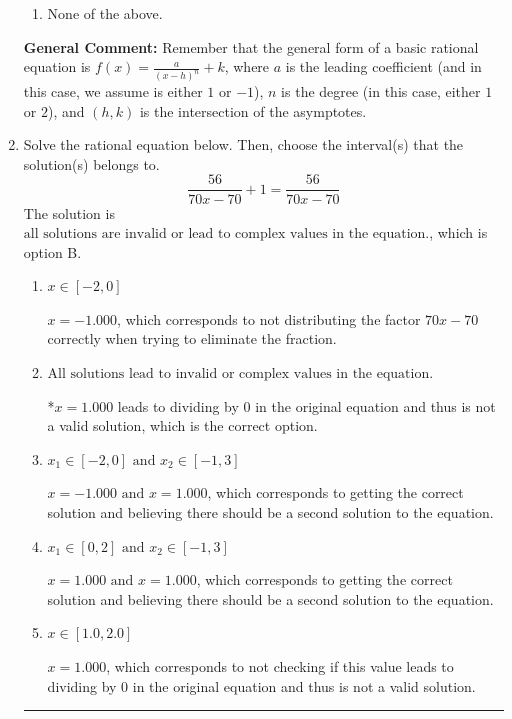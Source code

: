\documentclass{extbook}[14pt]
\newcommand{\litem}[1]{\item #1

\rule{\textwidth}{0.4pt}}
\begin{document}
\begin{enumerate}
{\begin{enumerate}[label=\Alph*.]
\begin{multicols}{2}
\end{multicols}\item None of the above.\end{enumerate}
\textbf{General Comment:} Remember that the general form of a basic rational equation is $ f(x) = \frac{a}{(x-h)^n} + k$, where $a$ is the leading coefficient (and in this case, we assume is either $1$ or $-1$), $n$ is the degree (in this case, either $1$ or $2$), and $(h, k)$ is the intersection of the asymptotes.
}
\litem{
Solve the rational equation below. Then, choose the interval(s) that the solution(s) belongs to.
\[ \frac{56}{70x -70} + 1 = \frac{56}{70x -70} \]The solution is \( \text{all solutions are invalid or lead to complex values in the equation.} \), which is option B.\begin{enumerate}[label=\Alph*.]
\item \( x \in [-2,0] \)

$x = -1.000$, which corresponds to not distributing the factor $70x -70$ correctly when trying to eliminate the fraction.
\item \( \text{All solutions lead to invalid or complex values in the equation.} \)

*$x = 1.000$ leads to dividing by 0 in the original equation and thus is not a valid solution, which is the correct option.
\item \( x_1 \in [-2, 0] \text{ and } x_2 \in [-1,3] \)

$x = -1.000 \text{ and } x = 1.000$, which corresponds to getting the correct solution and believing there should be a second solution to the equation.
\item \( x_1 \in [0, 2] \text{ and } x_2 \in [-1,3] \)

$x = 1.000 \text{ and } x = 1.000$, which corresponds to getting the correct solution and believing there should be a second solution to the equation.
\item \( x \in [1.0,2.0] \)

$x = 1.000$, which corresponds to not checking if this value leads to dividing by 0 in the original equation and thus is not a valid solution.
\end{enumerate}

}
\end{enumerate}
\end{document}
